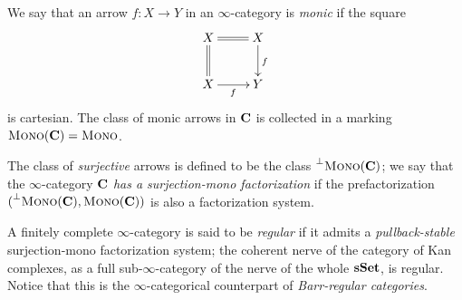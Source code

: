 \begin{example}\label{esem:monic}
We say that an arrow $f\colon X\to Y$ in an $\infty$\hyp{}category is \emph{monic} if the square
\[
\xymatrix{X \ar@{=}[r]\ar@{=}[d]& X \ar[d]^f \\ X \ar[r]_f & Y}
\] 
is cartesian. The class of monic arrows in $\mathbf{C}$ is collected in a marking $\textsc{Mono}(\mathbf{C})=\textsc{Mono}$.

The class of \emph{surjective} arrows is defined to be the class $\prescript{\perp}{}{\textsc{Mono}(\mathbf{C})}$; we say that the $\infty$\hyp{}category $\mathbf{C}$ \emph{has a surjection\hyp{}mono factorization} if the prefactorization $(\prescript{\perp}{}{\textsc{Mono}(\mathbf{C})}, \textsc{Mono}(\mathbf{C}))$ is also a factorization system.
\end{example}
\begin{definition}
A finitely complete $\infty$\hyp{}category is said to be \emph{regular} if it admits a \emph{pullback\hyp{}stable} surjection\hyp{}mono factorization system; the coherent nerve of the category of Kan complexes, as a full sub\hyp{}$\infty$\hyp{}category of the nerve of the whole $\mathbf{sSet}$, is regular. Notice that this is the $\infty$\hyp{}categorical counterpart of \emph{Barr\hyp{}regular categories}.
\end{definition}
